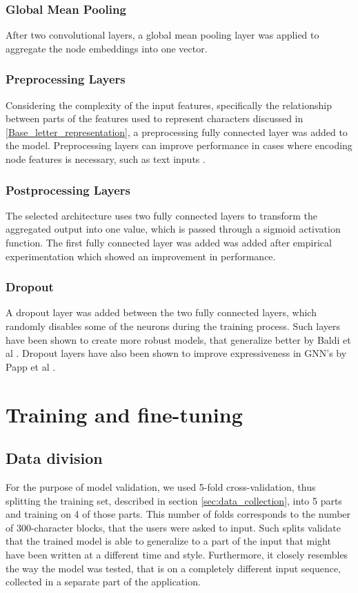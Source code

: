 \subsubsection{Global Mean Pooling}
After two convolutional layers, a global mean pooling layer was applied to aggregate the node embeddings into one vector. 


\subsubsection{Preprocessing Layers}
Considering the complexity of the input features, specifically the relationship between parts of the features used to represent characters discussed in \ref{Base_letter_representation}, a preprocessing fully connected layer was added to the model. Preprocessing layers can improve performance in cases where encoding node features is necessary, such as text inputs \cite{Lesk2024}.

\subsubsection{Postprocessing Layers}
The selected architecture uses two fully connected layers to transform the aggregated output into one value, 
which is passed through a sigmoid activation function. The first fully connected layer was added was added after empirical experimentation which showed an improvement in performance.


\subsubsection{Dropout}
A dropout layer was added between the two fully connected layers, which randomly disables some of the neurons during the training process. Such layers have been shown to create more robust models, that generalize better by Baldi et al \cite{NIPS2013_71f6278d}. Dropout layers have also been shown to improve expressiveness in GNN's by Papp et al \cite{NEURIPS2021_b8b2926b}.

\section{Training and fine-tuning}

\subsection{Data division}
For the purpose of model validation, we used 5-fold cross-validation, thus splitting the training set, described in section \ref{sec:data_collection}, into 5 parts and training on 4 of those parts. This number of folds corresponds to the number of 300-character blocks, that the users were asked to input. Such splits validate that the trained model is able to generalize to a part of the input that might have been written at a different time and style. Furthermore, it closely resembles the way the model was tested, that is on a completely different input sequence, collected in a separate part of the application.  

